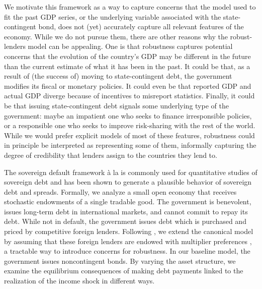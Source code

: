 We motivate this framework as a way to capture concerns that the model used to fit the past GDP series, or the underlying variable associated with the state-contingent bond, does not (yet) accurately capture all relevant features of the economy. While we do not pursue them, there are other reasons why the robust-lenders model can be appealing. One is that robustness captures potential concerns that the evolution of the country's GDP may be different in the future than the current estimate of what it has been in the past. It could be that, as a result of (the success of) moving to state-contingent debt, the government modifies its fiscal or monetary policies. It could even be that reported GDP and actual GDP diverge because of incentives to misreport statistics. Finally, it could be that issuing state-contingent debt signals some underlying type of the government: maybe an impatient one who seeks to finance irresponsible policies, or a responsible one who seeks to improve risk-sharing with the rest of the world. While we would prefer explicit models of most of these features, robustness could in principle be interpreted as representing some of them, informally capturing the degree of credibility that lenders assign to the countries they lend to.

The sovereign default framework à la \cite{Eaton81} is commonly used for quantitative studies of sovereign debt and has been shown to generate a plausible behavior of sovereign debt and spreads. Formally, we analyze a small open economy that receives stochastic endowments of a single tradable good. The government is benevolent, issues long-term debt in international markets, and cannot commit to repay its debt. While not in default, the government issues debt which is purchased and priced by competitive foreign lenders. Following \cite{PouzoPresno2016}, we extend the canonical model by assuming that these foreign lenders are endowed with multiplier preferences \citep{HansenSargent2001}, a tractable way to introduce concerns for robustness. In our baseline model, the government issues noncontingent bonds. By varying the asset structure, we examine the equilibrium consequences of making debt payments linked to the realization of the income shock in different ways.

